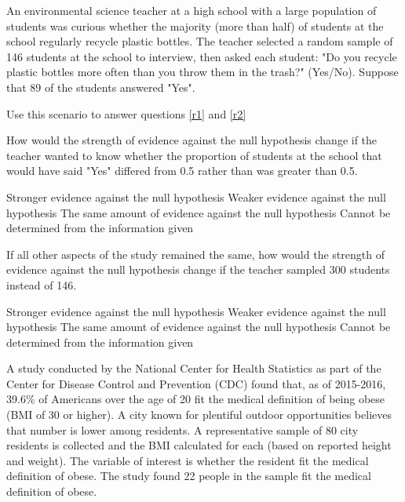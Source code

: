 \documentclass{article}
\begin{document}
\begin{mcquestions}
		\begin{mcquestioninstruction}
			An environmental science teacher at a high school with a large population of students was curious whether the majority (more than half) of students at the school regularly recycle plastic bottles. The teacher selected a random sample of 146 students at the school to interview, then asked each student: "Do you recycle plastic bottles more often than you throw them in the trash?" (Yes/No). Suppose that 89 of the students answered "Yes".
			
			Use this scenario to answer questions \ref{r1} and \ref{r2}
		\end{mcquestioninstruction}
		
		\question  How would the strength of evidence against the null hypothesis change if the teacher wanted to know whether the proportion of students at the school that would have said "Yes" differed from 0.5 rather than was greater than 0.5.\label{r1}
		
		\begin{mcanswerslist}
			\answer Stronger evidence against the null hypothesis
			\answer[correct] Weaker evidence against the null hypothesis
			\answer The same amount of evidence against the null hypothesis
			\answer Cannot be determined from the information given
		\end{mcanswerslist}
		
		\question[follow]  If all other aspects of the study remained the same, how would the strength of evidence against the null hypothesis change if the teacher sampled 300 students instead of 146.\label{r2}
		\begin{mcanswerslist}
			\answer[correct] Stronger evidence against the null hypothesis
			\answer Weaker evidence against the null hypothesis
			\answer The same amount of evidence against the null hypothesis
			\answer Cannot be determined from the information given
		\end{mcanswerslist}
		
		\begin{mcquestioninstruction}
			A study conducted by the National Center for Health Statistics as part of the Center for Disease Control and Prevention (CDC) found that, as of 2015-2016, 39.6\% of Americans over the age of 20 fit the medical definition of being obese (BMI of 30 or higher). A city known for plentiful outdoor opportunities believes that number is lower among residents. A representative sample of 80 city residents is collected and the BMI calculated for each (based on reported height and weight). The variable of interest is whether the resident fit the medical definition of obese. The study found 22 people in the sample fit the medical definition of obese.
			

\end{mcquestioninstruction}
\end{mcquestions}
\end{document}
